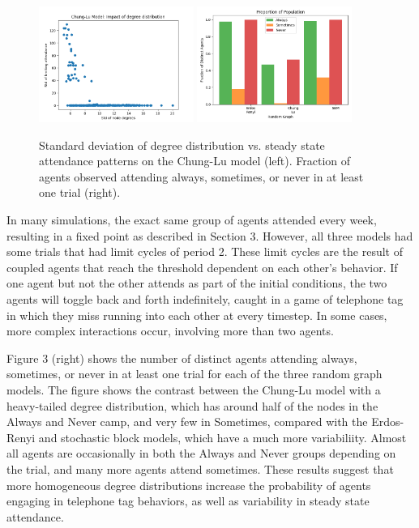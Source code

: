 \documentclass[12pt]{article}
\begin{document}
\begin{figure}
  \includegraphics[width=0.45\textwidth]{chung_lu_std.png}
  \includegraphics[width=0.45\textwidth]{always_sometimes_never.png}
  \caption{Standard deviation of degree distribution vs. steady state attendance patterns on the Chung-Lu model (left).  Fraction of agents observed attending always, sometimes, or never in at least one trial (right).}
\end{figure}

In many simulations, the exact same group of agents attended every week, resulting in a fixed point as described in Section 3.  However, all three models had some trials that had limit cycles of period 2.   These limit cycles are the result of coupled agents that reach the threshold dependent on each other's behavior.  If one agent but not the other attends as part of the initial conditions, the two agents will toggle back and forth indefinitely, caught in a game of telephone tag in which they miss running into each other at every timestep.  In some cases, more complex interactions occur, involving more than two agents.

Figure 3 (right) shows the number of distinct agents attending always, sometimes, or never in at least one trial for each of the three random graph models.  The figure shows the contrast between the Chung-Lu model with a heavy-tailed degree distribution, which has around half of the nodes in the Always and Never camp, and very few in Sometimes, compared with the Erdos-Renyi and stochastic block models, which have a much more variabiliity.  Almost all agents are occasionally in both the Always and Never groups depending on the trial, and many more agents attend sometimes.  These results suggest that more homogeneous degree distributions increase the probability of agents engaging in telephone tag behaviors, as well as variability in steady state attendance.
\end{document}
